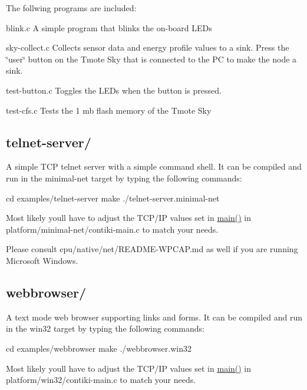 The follwing programs are included\+:


\begin{DoxyItemize}
\item blink.\+c A simple program that blinks the on-\/board L\+E\+Ds
\item sky-\/collect.\+c Collects sensor data and energy profile values to a sink. Press the \char`\"{}user\char`\"{} button on the Tmote Sky that is connected to the P\+C to make the node a sink.
\item test-\/button.\+c Toggles the L\+E\+Ds when the button is pressed.
\item test-\/cfs.\+c Tests the 1 mb flash memory of the Tmote Sky
\end{DoxyItemize}

\subsection*{telnet-\/server/ }

A simple T\+C\+P telnet server with a simple command shell. It can be compiled and run in the \textquotesingle{}minimal-\/net\textquotesingle{} target by typing the following commands\+: \begin{DoxyVerb}cd examples/telnet-server
make
./telnet-server.minimal-net
\end{DoxyVerb}


Most likely you\textquotesingle{}ll have to adjust the T\+C\+P/\+I\+P values set in \hyperlink{group__IPV6_ga0c99d968a34e803d378692bde2e3f18f}{main()} in platform/minimal-\/net/contiki-\/main.\+c to match your needs.

Please consult cpu/native/net/\+R\+E\+A\+D\+M\+E-\/\+W\+P\+C\+A\+P.\+md as well if you are running Microsoft Windows.

\subsection*{webbrowser/ }

A text mode web browser supporting links and forms. It can be compiled and run in the \textquotesingle{}win32\textquotesingle{} target by typing the following commands\+: \begin{DoxyVerb}cd examples/webbrowser
make
./webbrowser.win32
\end{DoxyVerb}


Most likely you\textquotesingle{}ll have to adjust the T\+C\+P/\+I\+P values set in \hyperlink{group__IPV6_ga0c99d968a34e803d378692bde2e3f18f}{main()} in platform/win32/contiki-\/main.\+c to match your needs.

